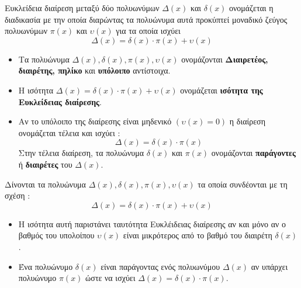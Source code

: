 \documentclass[twoside,nofonts,internet,shmeiwseis]{thewria}
\begin{document}
\orismoi
{}
Ευκλείδεια διαίρεση μεταξύ δύο πολυωνύμων $ \varDelta(x) $ και $ \delta(x) $ ονομάζεται η διαδικασία με την οποία διαρώντας τα πολυώνυμα αυτά προκύπτεί μοναδικό ζεύγος πολυωνύμων $ \pi(x) $ και $ \upsilon(x) $ για τα οποία ισχύει
\[ \varDelta(x)=\delta(x)\cdot\pi(x)+\upsilon(x) \]
\begin{itemize}
\item Τα πολυώνυμα $ \varDelta(x),\delta(x),\pi(x),\upsilon(x) $ ονομάζονται \textbf{Διαιρετέος, διαιρέτης, πηλίκο} και \textbf{υπόλοιπο} αντίστοιχα.
\item Η ισότητα $ \varDelta(x)=\delta(x)\cdot\pi(x)+\upsilon(x) $ ονομάζεται \textbf{ισότητα της Ευκλείδειας διαίρεσης}.
\item Αν το υπόλοιπο της διαίρεσης είναι μηδενικό $ (\upsilon(x)=0) $ η διαίρεση ονομάζεται τέλεια και ισχύει :
\[ \varDelta(x)=\delta(x)\cdot\pi(x) \]
Στην τέλεια διαίρεση, τα πολυώνυμα $ \delta(x) $ και $ \pi(x) $ ονομάζονται \textbf{παράγοντες} ή \textbf{διαιρέτες} του $ \varDelta(x) $.
\end{itemize}
\thewrhmata
{}
Δίνονται τα πολυώνυμα $ \varDelta(x),\delta(x),\pi(x),\upsilon(x) $ τα οποία συνδέονται με τη σχέση :
\[ \varDelta(x)=\delta(x)\cdot\pi(x)+\upsilon(x) \]
\begin{itemize}
\item Η ισότητα αυτή παριστάνει ταυτότητα Ευκλέιδειας διαίρεσης αν και μόνο αν ο βαθμός του υπολοίπου $ \upsilon(x) $ είναι μικρότερος από το βαθμό του διαιρέτη $ \delta(x) $.
\item Ένα πολυώνυμο $ \delta(x) $ είναι παράγοντας ενός πολυωνύμου $ \varDelta(x) $ αν υπάρχει πολυώνυμο $ \pi(x) $ ώστε να ισχύει $ \varDelta(x)=\delta(x)\cdot\pi(x) $.
\end{itemize}
\end{document}

